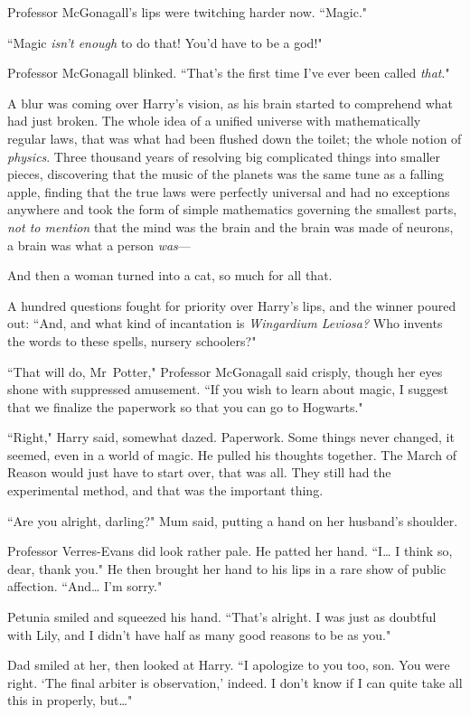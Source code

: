Professor McGonagall's lips were twitching harder now. ``Magic."

``Magic \emph{isn't enough} to do that! You'd have to be a god!"

Professor McGonagall blinked. ``That's the first time I've ever been called \emph{that}."

A blur was coming over Harry's vision, as his brain started to comprehend what had just broken. The whole idea of a unified universe with mathematically regular laws, that was what had been flushed down the toilet; the whole notion of \emph{physics}. Three thousand years of resolving big complicated things into smaller pieces, discovering that the music of the planets was the same tune as a falling apple, finding that the true laws were perfectly universal and had no exceptions anywhere and took the form of simple mathematics governing the smallest parts, \emph{not to mention} that the mind was the brain and the brain was made of neurons, a brain was what a person \emph{was}---

And then a woman turned into a cat, so much for all that.

A hundred questions fought for priority over Harry's lips, and the winner poured out: ``And, and what kind of incantation is \emph{Wingardium Leviosa?} Who invents the words to these spells, nursery schoolers?"

``That will do, Mr~Potter," Professor McGonagall said crisply, though her eyes shone with suppressed amusement. ``If you wish to learn about magic, I suggest that we finalize the paperwork so that you can go to Hogwarts."

``Right," Harry said, somewhat dazed. Paperwork. Some things never changed, it seemed, even in a world of magic. He pulled his thoughts together. The March of Reason would just have to start over, that was all. They still had the experimental method, and that was the important thing.

``Are you alright, darling?" Mum said, putting a hand on her husband's shoulder.

Professor Verres-Evans did look rather pale. He patted her hand. ``I{\ldots} I think so, dear, thank you." He then brought her hand to his lips in a rare show of public affection. ``And{\ldots} I'm sorry."

Petunia smiled and squeezed his hand. ``That's alright. I was just as doubtful with Lily, and I didn't have half as many good reasons to be as you."

Dad smiled at her, then looked at Harry. ``I apologize to you too, son. You were right. `The final arbiter is observation,' indeed. I don't know if I can quite take all this in properly, but{\ldots}"


